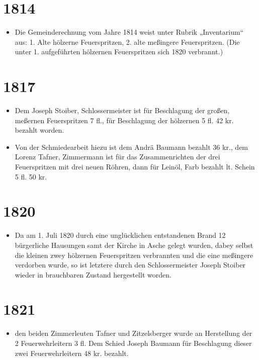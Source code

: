 \documentclass[12pt,a4paper]{book}
\begin{document}
\section*{1814}

\begin{itemize}
\item Die Gemeinderechnung vom Jahre 1814 weist unter Rubrik „Inventarium“ aus:
1. Alte hölzerne Feuerspritzen, 2. alte meßingere Feuerspritzen. (Die unter 1.
aufgeführten hölzernen Feuerspritzen sich 1820 verbrannt.)
\end{itemize}

\section*{1817}

\begin{itemize}
\item Dem Joseph Stoiber, Schlossermeister ist für Beschlagung der großen,
meßernen Feuerspritzen 7 fl., für Beschlagung der hölzernen 5 fl. 42 kr. bezahlt
worden.

\item Von der Schmiedearbeit hiezu ist dem Andrä Baumann bezahlt 36 kr., dem
Lorenz Tafner, Zimmermann ist für das Zusammenrichten der drei Feuerspritzen mit
drei neuen Röhren, dann für Leinöl, Farb bezahlt lt. Schein 5 fl. 50 kr.
\end{itemize}

\section*{1820}

\begin{itemize}
\item Da am 1. Juli 1820 durch eine unglücklichen entstandenen Brand 12
bürgerliche Hausungen samt der Kirche in Asche gelegt wurden, dabey selbst die
kleinen zwey hölzernen Feuerspritzen verbrannten und die eine meßingere
verdorben wurde, so ist letztere durch den Schlossermeister Joseph Stoiber
wieder in brauchbaren Zustand hergestellt worden.
\end{itemize}

\section*{1821}

\begin{itemize}
\item den beiden Zimmerleuten Tafner und Zitzelsberger wurde an Herstellung der
2 Feuerwehrleitern 3 fl. Dem Schied Joseph Baumann für Beschlagung dieser zwei
Feuerwehrleitern 48 kr. bezahlt.
\end{itemize}
\end{document}
